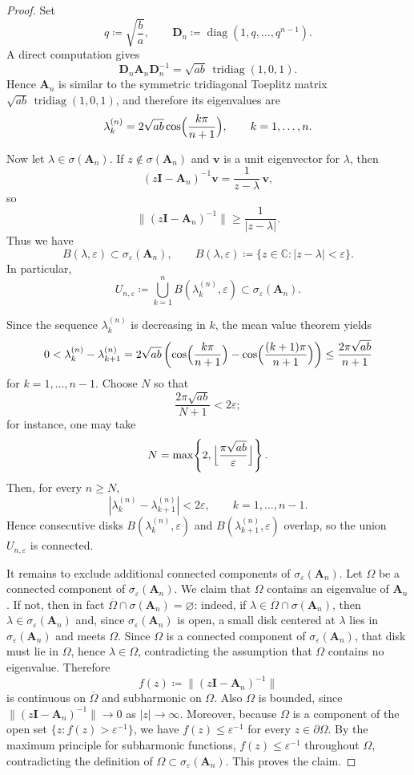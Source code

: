 \documentclass[11pt]{article}
\begin{document}
\begin{proof}
Set
\[
q\coloneqq \sqrt{\frac{b}{a}},
\qquad
\mathbf{D}_n\coloneqq \operatorname{diag}(1,q,\dots,q^{n-1}).
\]
A direct computation gives
\[
\mathbf{D}_n\mathbf{A}_n\mathbf{D}_n^{-1}=\sqrt{ab}\,\operatorname{tridiag}(1,0,1).
\]
Hence $\mathbf{A}_n$ is similar to the symmetric tridiagonal Toeplitz matrix
$\sqrt{ab}\,\operatorname{tridiag}(1,0,1)$, and therefore its eigenvalues are
\[
\lambda_k^{(n)}=2\sqrt{ab}\cos\Bigl(\frac{k\pi}{n+1}\Bigr),
\qquad k=1,\dots,n.
\]

Now let $\lambda\in\sigma(\mathbf{A}_n)$. If $z\notin\sigma(\mathbf{A}_n)$ and $\mathbf{v}$ is a unit eigenvector
for $\lambda$, then
\[
(z\mathbf{I}-\mathbf{A}_n)^{-1}\mathbf{v}=\frac{1}{z-\lambda}\,\mathbf{v},
\]
so
\[
\|(z\mathbf{I}-\mathbf{A}_n)^{-1}\|
\ge \frac{1}{|z-\lambda|}.
\]
Thus we have
\[
B(\lambda,\varepsilon)\subset \sigma_\varepsilon(\mathbf{A}_n),
\qquad
B(\lambda,\varepsilon)\coloneqq\{z\in\mathbb{C}\colon|z-\lambda|<\varepsilon\}.
\]
In particular,
\[
U_{n,\varepsilon}\coloneqq \bigcup_{k=1}^n B(\lambda_k^{(n)},\varepsilon)
\subset \sigma_\varepsilon(\mathbf{A}_n).
\]

Since the sequence $\lambda_k^{(n)}$ is decreasing in $k$, the mean value theorem
yields
\[
0<\lambda_k^{(n)}-\lambda_{k+1}^{(n)}
=2\sqrt{ab}\left(
\cos\Bigl(\frac{k\pi}{n+1}\Bigr)
-\cos\Bigl(\frac{(k+1)\pi}{n+1}\Bigr)
\right)
\le \frac{2\pi\sqrt{ab}}{n+1}
\]
for $k=1,\dots,n-1$. Choose $N$ so that
\[
\frac{2\pi\sqrt{ab}}{N+1}<2\varepsilon;
\]
for instance, one may take
\[
N=\max\!\left\{2,\Bigl\lfloor \frac{\pi\sqrt{ab}}{\varepsilon}\Bigr\rfloor\right\}.
\]
Then, for every $n\ge N$,
\[
|\lambda_k^{(n)}-\lambda_{k+1}^{(n)}|<2\varepsilon,
\qquad k=1,\dots,n-1.
\]
Hence consecutive disks $B(\lambda_k^{(n)},\varepsilon)$ and
$B(\lambda_{k+1}^{(n)},\varepsilon)$ overlap, so the union $U_{n,\varepsilon}$ is connected.

It remains to exclude additional connected components of $\sigma_\varepsilon(\mathbf{A}_n)$.
Let $\Omega$ be a connected component of $\sigma_\varepsilon(\mathbf{A}_n)$.
We claim that $\Omega$ contains an eigenvalue of $\mathbf{A}_n$.
If not, then in fact $\overline{\Omega}\cap\sigma(\mathbf{A}_n)=\varnothing$: indeed, if
$\lambda\in\overline{\Omega}\cap\sigma(\mathbf{A}_n)$, then $\lambda\in\sigma_\varepsilon(\mathbf{A}_n)$
and, since $\sigma_\varepsilon(\mathbf{A}_n)$ is open, a small disk centered at $\lambda$ lies
in $\sigma_\varepsilon(\mathbf{A}_n)$ and meets $\Omega$. Since $\Omega$ is a connected component
of $\sigma_\varepsilon(\mathbf{A}_n)$, that disk must lie in $\Omega$, hence $\lambda\in\Omega$,
contradicting the assumption that $\Omega$ contains no eigenvalue. Therefore
\[
f(z)\coloneqq \|(z\mathbf{I}-\mathbf{A}_n)^{-1}\|
\]
is continuous on $\overline{\Omega}$ and subharmonic on $\Omega$. Also $\Omega$ is
bounded, since $\|(z\mathbf{I}-\mathbf{A}_n)^{-1}\|\to 0$ as $|z|\to\infty$.
Moreover, because $\Omega$ is a component of the open set
$\{z\colon f(z)>\varepsilon^{-1}\}$, we have $f(z)\le \varepsilon^{-1}$ for every
$z\in\partial\Omega$. By the maximum principle for subharmonic functions,
$f(z)\le \varepsilon^{-1}$ throughout $\Omega$, contradicting the definition of
$\Omega\subset\sigma_\varepsilon(\mathbf{A}_n)$. This proves the claim.


\end{proof}
\end{document}

